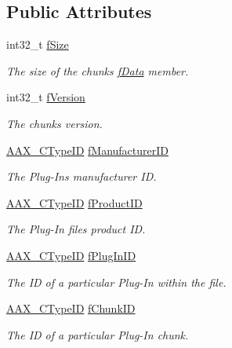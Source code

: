 \subsection*{Public Attributes}
\begin{DoxyCompactItemize}
\item 
int32\+\_\+t \mbox{\hyperlink{a01421_ac08f37f1ed50eac8ac3ca4bf5494c84d}{f\+Size}}
\begin{DoxyCompactList}\small\item\em The size of the chunk\textquotesingle{}s \mbox{\hyperlink{a01421_abc76d66fffa4a59ee5cfdbdd992c532c}{f\+Data}} member. \end{DoxyCompactList}\item 
int32\+\_\+t \mbox{\hyperlink{a01421_ac114fd94e7b12c235f9c18bcbbc46f06}{f\+Version}}
\begin{DoxyCompactList}\small\item\em The chunk\textquotesingle{}s version. \end{DoxyCompactList}\item 
\mbox{\hyperlink{a00392_ac678f9c1fbcc26315d209f71a147a175}{A\+A\+X\+\_\+\+C\+Type\+ID}} \mbox{\hyperlink{a01421_a88197dbb1057c5035370943550a3284e}{f\+Manufacturer\+ID}}
\begin{DoxyCompactList}\small\item\em The Plug-\/\+In\textquotesingle{}s manufacturer ID. \end{DoxyCompactList}\item 
\mbox{\hyperlink{a00392_ac678f9c1fbcc26315d209f71a147a175}{A\+A\+X\+\_\+\+C\+Type\+ID}} \mbox{\hyperlink{a01421_abfaa54962ff0b39cee02cffc777d0038}{f\+Product\+ID}}
\begin{DoxyCompactList}\small\item\em The Plug-\/\+In file\textquotesingle{}s product ID. \end{DoxyCompactList}\item 
\mbox{\hyperlink{a00392_ac678f9c1fbcc26315d209f71a147a175}{A\+A\+X\+\_\+\+C\+Type\+ID}} \mbox{\hyperlink{a01421_af3d433e0a0c022cf84f1cc7dc4862bda}{f\+Plug\+In\+ID}}
\begin{DoxyCompactList}\small\item\em The ID of a particular Plug-\/\+In within the file. \end{DoxyCompactList}\item 
\mbox{\hyperlink{a00392_ac678f9c1fbcc26315d209f71a147a175}{A\+A\+X\+\_\+\+C\+Type\+ID}} \mbox{\hyperlink{a01421_a061e99935a8e743891c4051f1a6ecba2}{f\+Chunk\+ID}}
\begin{DoxyCompactList}\small\item\em The ID of a particular Plug-\/\+In chunk. \end{DoxyCompactList}\item 

\end{DoxyCompactItemize}
